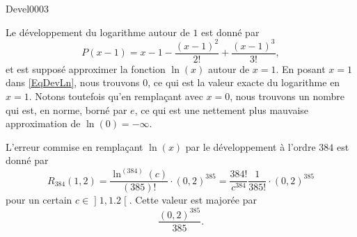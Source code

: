 
\begin{corrige}{Devel0003}

Le développement du logarithme autour de $1$ est donné par
\begin{equation}	\label{EqDevLn}
	P(x-1)=x-1-\frac{ (x-1)^2 }{ 2! }+\frac{ (x-1)^3 }{ 3! },
\end{equation}
et est supposé approximer la fonction $\ln(x)$ autour de $x=1$. En posant $x=1$ dans \eqref{EqDevLn}, nous trouvons $0$, ce qui est la valeur exacte du logarithme en $x=1$. Notons toutefois qu'en remplaçant avec $x=0$, nous trouvons un nombre qui est, en norme, borné par $e$, ce qui est une nettement plus mauvaise approximation de $\ln(0)=-\infty$.

L'erreur commise en remplaçant $\ln(x)$ par le développement à l'ordre $384$ est donné par
\begin{equation}
	R_{384}(1,2)=\frac{ \ln^{(384)}(c) }{ (385)! }\cdot (0,2)^{385}=\frac{ 384! }{ c^{384} }\frac{1}{ 385! }\cdot(0,2)^{385}
\end{equation}
pour un certain $c\in\mathopen]1,1.2\mathclose[$. Cette valeur est majorée par 
\begin{equation}
	\frac{ (0,2)^{385} }{ 385 }.
\end{equation}

\end{corrige}
